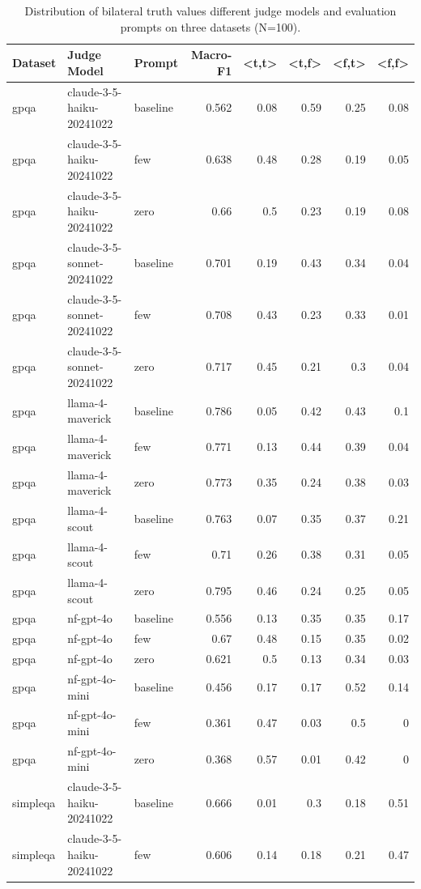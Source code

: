 \begin{table}[htbp]
\caption{Distribution of bilateral truth values different judge models and evaluation prompts on three datasets (N=100).}
\label{tab:exptvdist}
\begin{tabular}{lllrrrrr}
\toprule
Dataset & Judge Model & Prompt & Macro-F1 & <t,t> & <t,f> & <f,t> & <f,f> \\
\midrule
gpqa & claude-3-5-haiku-20241022 & baseline & 0.562 & 0.08 & 0.59 & 0.25 & 0.08 \\
gpqa & claude-3-5-haiku-20241022 & few & 0.638 & 0.48 & 0.28 & 0.19 & 0.05 \\
gpqa & claude-3-5-haiku-20241022 & zero & 0.66 & 0.5 & 0.23 & 0.19 & 0.08 \\
gpqa & claude-3-5-sonnet-20241022 & baseline & 0.701 & 0.19 & 0.43 & 0.34 & 0.04 \\
gpqa & claude-3-5-sonnet-20241022 & few & 0.708 & 0.43 & 0.23 & 0.33 & 0.01 \\
gpqa & claude-3-5-sonnet-20241022 & zero & 0.717 & 0.45 & 0.21 & 0.3 & 0.04 \\
gpqa & llama-4-maverick & baseline & 0.786 & 0.05 & 0.42 & 0.43 & 0.1 \\
gpqa & llama-4-maverick & few & 0.771 & 0.13 & 0.44 & 0.39 & 0.04 \\
gpqa & llama-4-maverick & zero & 0.773 & 0.35 & 0.24 & 0.38 & 0.03 \\
gpqa & llama-4-scout & baseline & 0.763 & 0.07 & 0.35 & 0.37 & 0.21 \\
gpqa & llama-4-scout & few & 0.71 & 0.26 & 0.38 & 0.31 & 0.05 \\
gpqa & llama-4-scout & zero & 0.795 & 0.46 & 0.24 & 0.25 & 0.05 \\
gpqa & nf-gpt-4o & baseline & 0.556 & 0.13 & 0.35 & 0.35 & 0.17 \\
gpqa & nf-gpt-4o & few & 0.67 & 0.48 & 0.15 & 0.35 & 0.02 \\
gpqa & nf-gpt-4o & zero & 0.621 & 0.5 & 0.13 & 0.34 & 0.03 \\
gpqa & nf-gpt-4o-mini & baseline & 0.456 & 0.17 & 0.17 & 0.52 & 0.14 \\
gpqa & nf-gpt-4o-mini & few & 0.361 & 0.47 & 0.03 & 0.5 & 0 \\
gpqa & nf-gpt-4o-mini & zero & 0.368 & 0.57 & 0.01 & 0.42 & 0 \\
simpleqa & claude-3-5-haiku-20241022 & baseline & 0.666 & 0.01 & 0.3 & 0.18 & 0.51 \\
simpleqa & claude-3-5-haiku-20241022 & few & 0.606 & 0.14 & 0.18 & 0.21 & 0.47 \\

\end{tabular}
\end{table}
